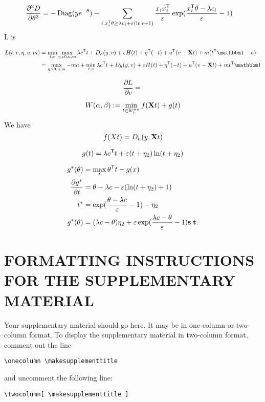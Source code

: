 $$
\begin{aligned}
\frac{\partial^{2} D}{\partial \theta^{2}} &=  -\operatorname{Diag}(ye^{-\theta}) -  \sum_{i,x_i^{\mathsf T}\theta\geq\lambda c_i +\varepsilon(\ln \epsilon + 1)} \frac{x_i x_i^{\mathsf T}}{\varepsilon}\exp(\frac{x_i^{\mathsf T}\theta-\lambda c_i}{\varepsilon}-1)
\end{aligned}
$$
L is

$$
\begin{aligned}
L(t,v,\eta,u,m) &= \min_{t,v} \max_{\eta>0,u,m} \lambda c^{\tranT}t + D_h(y,v) + \varepsilon H(t) + \eta ^{\tranT} (-t) +u^{\tranT}(v-\X t) + m( t^{\tranT}\one - a)\\
&= \max_{\eta>0,u,m} -ma + \min_{t,v}  \lambda c^{\tranT}t + D_h(y,v) + \varepsilon H(t) + \eta ^{\tranT} (-t) +u^{\tranT}(v-\X t) + m t^{\tranT}\one 
\end{aligned}
$$

\begin{equation}
\frac{\partial L}{\partial v} = 
\end{equation}

\begin{equation}
W(\alpha,\beta) := \min_{t \in \mathbb{R}_{+}^{mn}} f(\mathbf{X} t) + g(t)
\end{equation}
We have 
$$
f(Xt) = D_h(y,\mathbf{X} t) 
$$

$$
g(t) = \lambda c^{\mathsf T}t +  \varepsilon (t +\eta_2) \ln (t+\eta_2)
$$

$$
\begin{aligned}
g^*(\theta) &= \max_{t} \theta^{\mathsf T} t - g(x)\\
\frac{\partial g^*}{\partial t} &= \theta - \lambda c - \varepsilon(\ln (t+\eta_2)+1) \\
t^* &= \exp (\frac{\theta - \lambda c}{\varepsilon}-1) - \eta_2\\
g^*(\theta) &= (\lambda c-\theta)\eta_2 + \varepsilon \exp(\frac{\lambda c-\theta}{\varepsilon}-1)
\mathbf{s.t.} 
\end{aligned}
$$

\section{FORMATTING INSTRUCTIONS FOR THE SUPPLEMENTARY MATERIAL}

Your supplementary material should go here. It may be in one-column or two-column format. To display the supplementary material in two-column format, comment out the line
\begin{verbatim}
\onecolumn \makesupplementtitle
\end{verbatim}
and uncomment the following line:
\begin{verbatim}
\twocolumn[ \makesupplementtitle ]
\end{verbatim}

